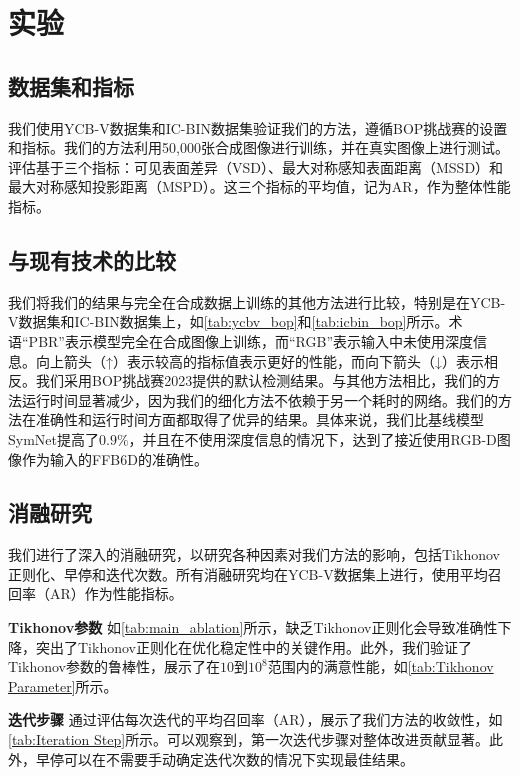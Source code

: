\section{实验}

\subsection{数据集和指标}
我们使用YCB-V数据集\cite{xiang2018posecnn}和IC-BIN数据集\cite{icbin}验证我们的方法，遵循BOP挑战赛\cite{hodan2024bop}的设置和指标。我们的方法利用50,000张合成图像进行训练，并在真实图像上进行测试。评估基于三个指标：可见表面差异（VSD）、最大对称感知表面距离（MSSD）和最大对称感知投影距离（MSPD）。这三个指标的平均值，记为AR，作为整体性能指标。

\subsection{与现有技术的比较}


我们将我们的结果与完全在合成数据上训练的其他方法进行比较，特别是在YCB-V数据集和IC-BIN数据集上，如\autoref{tab:ycbv_bop}和\autoref{tab:icbin_bop}所示。术语“PBR”表示模型完全在合成图像上训练，而“RGB”表示输入中未使用深度信息。向上箭头（↑）表示较高的指标值表示更好的性能，而向下箭头（↓）表示相反。我们采用BOP挑战赛2023\cite{hodan2024bop}提供的默认检测结果。与其他方法相比，我们的方法运行时间显著减少，因为我们的细化方法不依赖于另一个耗时的网络。我们的方法在准确性和运行时间方面都取得了优异的结果。具体来说，我们比基线模型SymNet\cite{symnet}提高了$0.9\%$，并且在不使用深度信息的情况下，达到了接近使用RGB-D图像作为输入的FFB6D\cite{he2021ffb6d}的准确性。

\subsection{消融研究}

我们进行了深入的消融研究，以研究各种因素对我们方法的影响，包括Tikhonov正则化、早停和迭代次数。所有消融研究均在YCB-V数据集上进行，使用平均召回率（AR）作为性能指标。



\textbf{Tikhonov参数 } 如\autoref{tab:main_ablation}所示，缺乏Tikhonov正则化会导致准确性下降，突出了Tikhonov正则化在优化稳定性中的关键作用。此外，我们验证了Tikhonov参数的鲁棒性，展示了在$10$到$10^8$范围内的满意性能，如\autoref{tab:Tikhonov Parameter}所示。


\textbf{迭代步骤 } 通过评估每次迭代的平均召回率（AR），展示了我们方法的收敛性，如\autoref{tab:Iteration Step}所示。可以观察到，第一次迭代步骤对整体改进贡献显著。此外，早停可以在不需要手动确定迭代次数的情况下实现最佳结果。

